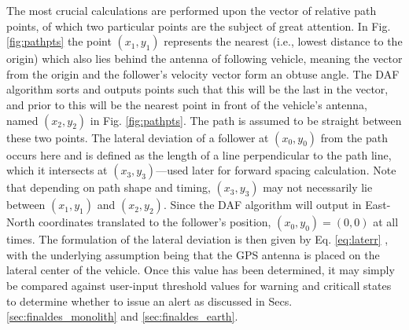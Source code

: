 \documentclass[12pt]{report}
\begin{document}
The most crucial calculations are performed upon the vector of relative path points, of which two particular points are the subject of great attention. In Fig. \ref{fig:pathpts} the point $(x_1,y_1)$ represents the nearest (i.e., lowest distance to the origin) which also lies behind the antenna of following vehicle, meaning the vector from the origin and the follower's velocity vector form an obtuse angle. The DAF algorithm sorts and outputs points such that this will be the last in the vector, and prior to this will be the nearest point in front of the vehicle's antenna, named $(x_2,y_2)$ in Fig. \ref{fig:pathpts}. The path is assumed to be straight between these two points. The lateral deviation of a follower at $(x_0, y_0)$ from the path occurs here and is defined as the length of a line perpendicular to the path line, which it intersects at $(x_3,y_3)$---used later for forward spacing calculation. Note that depending on path shape and timing, $(x_3,y_3)$ may not necessarily lie between $(x_1,y_1)$ and $(x_2,y_2)$. Since the DAF algorithm will output in East-North coordinates translated to the follower's position, $(x_0, y_0)=(0,0)$ at all times. The formulation of the lateral deviation is then given by Eq. \ref{eq:laterr} \cite{laterrformula}, with the underlying assumption being that the GPS antenna is placed on the lateral center of the vehicle. Once this value has been determined, it may simply be compared against user-input threshold values for warning and criticall states to determine whether to issue an alert as discussed in Secs. \ref{sec:finaldes_monolith} and \ref{sec:finaldes_earth}.
\end{document}
